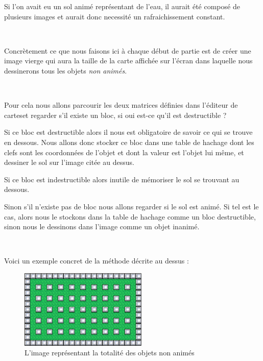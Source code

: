 {			
			Si l'on avait eu un sol animé représentant de l'eau, il aurait été composé de
			plusieurs images et aurait donc necessité un rafraichissement constant.

			$\,$
			
			Concrètement ce que nous faisons ici à chaque début de partie est de créer
			une image vierge qui aura la taille de la carte affichée sur l'écran dans
			laquelle nous dessinerons tous les objets \emph{non animés}.
			
			$\,$
			
			Pour cela nous allons parcourir les deux matrices définies dans l'éditeur de
			cartes\footnotemark[2] et regarder s'il existe un bloc, si oui est-ce
			qu'il est destructible ?
			
			Si ce bloc est destructible alors il nous est obligatoire de savoir ce qui se
			trouve en dessous.
			Nous allons donc stocker ce bloc dans une table de hachage dont les clefs sont les
			coordonnées de l'objet et dont la valeur est l'objet lui même, et dessiner le
			sol sur l'image citée au dessus.
			
			Si ce bloc est indestructible alors inutile de mémoriser le sol se trouvant
			au dessous.
			
			Sinon s'il n'existe pas de bloc nous allons regarder si le sol est animé. Si
			tel est le cas, alors nous le stockons dans la table de hachage comme un bloc
			destructible, sinon nous le dessinons dans l'image comme un objet inanimé.
			
			$\,$
			
			Voici un exemple concret de la méthode décrite au dessus :
				

			\begin{figure}[!h]			
				\begin{center}			
					\includegraphics[width=229px, height=142px]{Developpement/Img/map.eps}
					\caption{L'image représentant la totalité des objets non animés}
				\end{center}
			\end{figure}
			
			$\,$			

}
